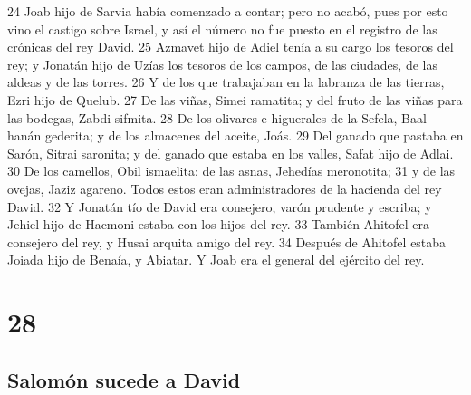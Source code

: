 24 Joab hijo de Sarvia había comenzado a contar; pero no acabó, pues por esto vino el castigo sobre Israel, y así el número no fue puesto en el registro de las crónicas del rey David.
25 Azmavet hijo de Adiel tenía a su cargo los tesoros del rey; y Jonatán hijo de Uzías los tesoros de los campos, de las ciudades, de las aldeas y de las torres.
26 Y de los que trabajaban en la labranza de las tierras, Ezri hijo de Quelub.
27 De las viñas, Simei ramatita; y del fruto de las viñas para las bodegas, Zabdi sifmita.
28 De los olivares e higuerales de la Sefela, Baal-hanán gederita; y de los almacenes del aceite, Joás.
29 Del ganado que pastaba en Sarón, Sitrai saronita; y del ganado que estaba en los valles, Safat hijo de Adlai.
30 De los camellos, Obil ismaelita; de las asnas, Jehedías meronotita;
31 y de las ovejas, Jaziz agareno. Todos estos eran administradores de la hacienda del rey David.
32 Y Jonatán tío de David era consejero, varón prudente y escriba; y Jehiel hijo de Hacmoni estaba con los hijos del rey.
33 También Ahitofel era consejero del rey, y Husai arquita amigo del rey.
34 Después de Ahitofel estaba Joiada hijo de Benaía, y Abiatar. Y Joab era el general del ejército del rey.

\chapter{28}

\section*{Salomón sucede a David}

